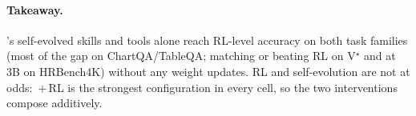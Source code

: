 \paragraph{Takeaway.}
\sysname{}'s self-evolved skills and tools alone reach RL-level accuracy on both task
families (most of the gap on ChartQA/TableQA; matching or beating RL on V$^\star$ and at
3B on HRBench4K) without any weight updates. RL and self-evolution are not at odds:
\sysname{}\,$+$\,RL is the strongest configuration in every cell, so the two
interventions compose additively.
\begin{table}[t]
\centering
\scriptsize
\setlength{\tabcolsep}{4pt}
\renewcommand{\arraystretch}{1.14}
\caption{%
  \textbf{Self-evolution vs.\ task-specific RL across two task families.}
  Acc. (\%) on Qwen2.5-VL 3B and 7B.
}
\label{tab:rl_combined}
\end{table}
